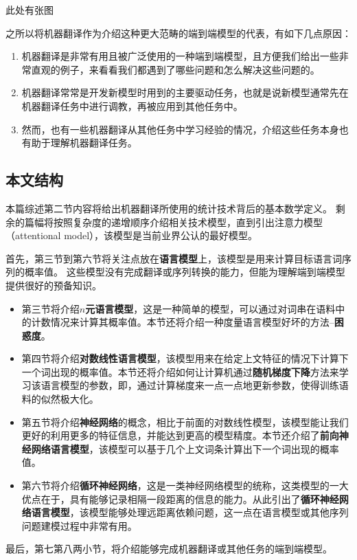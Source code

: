 \documentclass[10pt,a4paper]{ctexart}
\begin{document}
此处有张图

之所以将机器翻译作为介绍这种更大范畴的端到端模型的代表，有如下几点原因：
\begin{enumerate}
\item 机器翻译是非常有用且被广泛使用的一种端到端模型，且方便我们给出一些非常直观的例子，来看看我们都遇到了哪些问题和怎么解决这些问题的。
\item 机器翻译常常是开发新模型时用到的主要驱动任务，也就是说新模型通常先在机器翻译任务中进行调教，再被应用到其他任务中。
\item 然而，也有一些机器翻译从其他任务中学习经验的情况，介绍这些任务本身也有助于理解机器翻译任务。
\end{enumerate}

\subsection{本文结构}
本篇综述第二节内容将给出机器翻译所使用的统计技术背后的基本数学定义。
剩余的篇幅将按照复杂度的递增顺序介绍相关技术模型，直到引出注意力模型（attentional model），该模型是当前业界公认的最好模型。

首先，第三节到第六节将关注点放在\textbf{语言模型}上，该模型是用来计算目标语言词序列的概率值。
这些模型没有完成翻译或序列转换的能力，但能为理解端到端模型提供很好的预备知识。

\begin{itemize}
\item 第三节将介绍$n$\textbf{元语言模型}，这是一种简单的模型，可以通过对词串在语料中的计数情况来计算其概率值。本节还将介绍一种度量语言模型好坏的方法--\textbf{困惑度}。
\item 第四节将介绍\textbf{对数线性语言模型}，该模型用来在给定上文特征的情况下计算下一个词出现的概率值。本节还将介绍如何让计算机通过\textbf{随机梯度下降}方法来学习该语言模型的参数，即，通过计算梯度来一点一点地更新参数，使得训练语料的似然极大化。
\item 第五节将介绍\textbf{神经网络}的概念，相比于前面的对数线性模型，该模型能让我们更好的利用更多的特征信息，并能达到更高的模型精度。本节还介绍了\textbf{前向神经网络语言模型}，该模型可以基于几个上文词条计算出下一个词出现的概率值。
\item 第六节将介绍\textbf{循环神经网络}，这是一类神经网络模型的统称，这类模型的一大优点在于，具有能够记录相隔一段距离的信息的能力。从此引出了\textbf{循环神经网络语言模型}，该模型能够处理远距离依赖问题，这一点在语言模型或其他序列问题建模过程中非常有用。
\end{itemize}

最后，第七第八两小节，将介绍能够完成机器翻译或其他任务的端到端模型。
\end{document}
